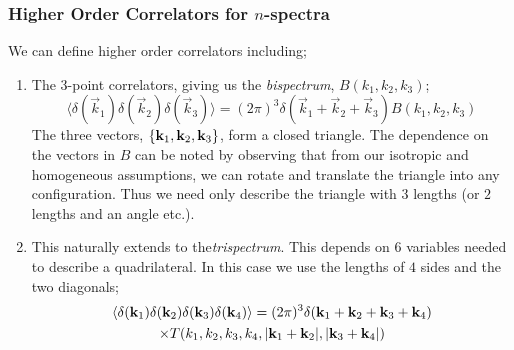 \subsubsection{Higher Order Correlators for $n$-spectra}
We can define higher order correlators including;
\begin{enumerate}
\item The 3-point correlators, giving us the \emph{bispectrum}, $B(k_1, k_2, k_3)$;
\begin{equation}
\langle \delta(\vec{k}_1) \delta(\vec{k}_2) \delta(\vec{k}_3) \rangle = (2\pi)^3 \delta(\vec{k}_1 + \vec{k}_2 + \vec{k}_3)B(k_1, k_2, k_3)
\end{equation}
The three vectors, $\set{\vec{k}_1, \vec{k}_2, \vec{k}_3}$, form a closed triangle. The dependence on the vectors in $B$ can be noted by observing that from our isotropic and homogeneous assumptions, we can rotate and translate the triangle into any configuration. Thus we need only describe the triangle with $3$ lengths (or $2$ lengths and an angle etc.).
\item This naturally extends to the\emph{trispectrum}. This depends on $6$ variables needed to describe a quadrilateral. In this case we use the lengths of $4$ sides and the two diagonals;
\begin{multline}
\langle \delta(\vec{k}_1)\delta(\vec{k}_2)\delta(\vec{k}_3)\delta(\vec{k}_4) \rangle = (2\pi)^3 \delta(\vec{k}_1 + \vec{k}_2 + \vec{k}_3 + \vec{k}_4) \\ \times T\left(k_1, k_2, k_3, k_4, \abs{\vec{k}_1 + \vec{k}_2}, \abs{\vec{k}_3 + \vec{k}_4}\right)
\end{multline}
\end{enumerate}
